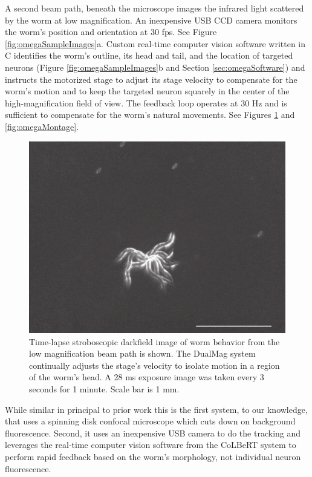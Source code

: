 A second beam path, beneath the microscope images the infrared light scattered by the worm at low magnification. An inexpensive USB CCD camera monitors the worm's position and orientation at 30 fps. See Figure \ref{fig:omegaSampleImages}a. Custom real-time computer vision software written in C identifies the worm's outline, its head and tail,  and the location of targeted neurons (Figure \ref{fig:omegaSampleImages}b and Section \ref{sec:omegaSoftware}) and instructs the motorized stage to adjust its stage velocity to compensate for the worm's motion and to keep the targeted neuron squarely in the center of the high-magnification field of view. The feedback loop operates at 30 Hz and is sufficient to compensate for the worm's natural movements. See Figures \ref{fig:omegaTimeLapse} and \ref{fig:omegaMontage}.


\begin{figure}  %
\includegraphics[width=\textwidth]{figures/omegaTimeLapse}
\caption[Time lapse image of behavior from low magnification beam path.]{Time-lapse stroboscopic darkfield image of worm behavior from the low magnification beam path is shown. The DualMag system continually adjusts the stage's velocity to isolate motion in a region of the worm's head. A 28 ms exposure image was taken every 3 seconds for 1 minute. Scale bar is 1 mm.
\label{fig:omegaTimeLapse}}
\end{figure}


While similar in principal to prior work \citep{ben_arous_automated_2010, piggott_neural_2011} this is the first system, to our knowledge, that uses a  spinning disk confocal microscope which cuts down on background fluorescence. Second, it uses an inexpensive USB camera to do the tracking and  leverages the real-time computer vision software from the CoLBeRT system \citep{leifer_optogenetic_2011} to perform rapid feedback based on the worm's morphology, not individual neuron fluorescence.





